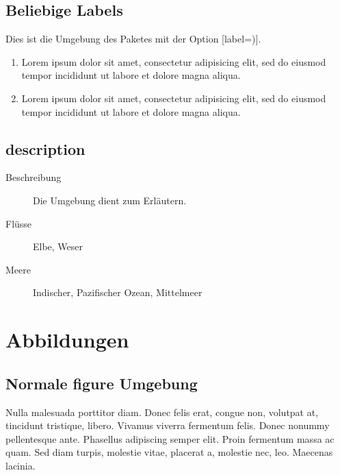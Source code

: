 
\subsection{Beliebige Labels}

Dies ist die  Umgebung des Paketes  mit der Option [label=)].

\begin{enumerate}[label=\alph{enumi})]
         \item Lorem ipsum dolor sit amet, consectetur adipisicing elit, sed do eiusmod tempor incididunt ut labore et dolore magna aliqua.
         \item Lorem ipsum dolor sit amet, consectetur adipisicing elit, sed do eiusmod tempor incididunt ut labore et dolore magna aliqua.
\end{enumerate}

\subsection{description}
%
\begin{description}
\item[Beschreibung] Die Umgebung  dient zum Erläutern.
\item[Flüsse] Elbe, Weser
\item[Meere] Indischer, Pazifischer Ozean, Mittelmeer
\end{description}

\section{Abbildungen}


\subsection{Normale figure Umgebung}
Nulla malesuada porttitor diam. Donec felis
erat, congue non, volutpat at, tincidunt tristique, libero. Vivamus
viverra fermentum felis. Donec nonummy pellentesque ante. Phasellus
adipiscing semper elit. Proin fermentum massa ac quam. Sed diam
turpis, molestie vitae, placerat a, molestie nec, leo. Maecenas
lacinia.

